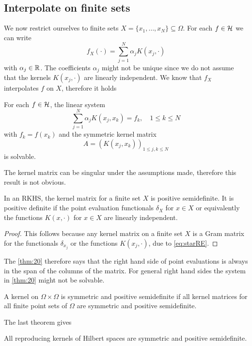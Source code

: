 \documentclass[../skript.tex]{subfiles}
\begin{document}
\subsection*{Interpolate on finite sets}
We now restrict ourselves to finite sets $X = \{ x_1, \ldots, x_N \} \subseteq \Omega$. For each $f \in \mathcal{H}$ we can write
\[
	f_X(\cdot) = \sum_{j=1}^N \alpha_j K(x_j, \cdot)
\]
with $\alpha_j \in \mathbb{R}$.
The coefficients $\alpha_j$ might not be unique since we do not assume that the kernels $K(x_j, \cdot)$ are linearly independent.
We know that $f_X$ interpolates $f$ on $X$, therefore it holds
\addtocounter{dummythm}{2} %
\begin{theorem} %
\label{thm:20}
For each $f \in \mathcal{H}$, the linear system
\[
	\sum_{j=1}^N \alpha_j K(x_j, x_k) = f_k, \quad 1 \leq k \leq N
\]
with $f_k = f(x_k)$ and the symmetric kernel matrix
\[
	A = (K(x_j, x_k))_{1 \leq j, k \leq N}
\]
is solvable.
\end{theorem}
\begin{remark}
The kernel matrix can be singular under the assumptions made, therefore this result is not obvious.
\end{remark}
\begin{theorem} %
\label{thm:21}
In an \ac{RKHS}, the kernel matrix for a finite set $X$ is positive semidefinite. It is positive definite if the point evaluation functionals $\delta_X$ for $x \in X$ or equivalently the functions $K(x, \cdot)$ for $x \in X$ are linearly independent.
\end{theorem}
\begin{proof}
This follows because any kernel matrix on a finite set $X$ is a Gram matrix for the functionals $\delta_{x_j}$ or the functions $K(x_j, \cdot)$, due to \cref{eq:starRE}.
\end{proof}
\begin{remark}
The \cref{thm:20} therefore says that the right hand side of point evaluations is always in the span of the columns of the matrix.
For general right hand sides the system in \cref{thm:20} might not be solvable.
\end{remark}
\begin{definition} %
\label{thm:22}
A kernel on $\Omega \times \Omega$ is symmetric and positive semidefinite if all kernel matrices for all finite point sets of $\Omega$ are symmetric and positive semidefinite.
\end{definition}
The last theorem gives
\begin{theorem} %
\label{thm:23}
All reproducing kernels of Hilbert spaces are symmetric and positive semidefinite.
\end{theorem}
\end{document}
